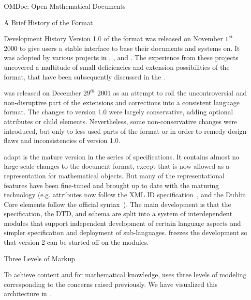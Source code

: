 \begin{tchapter}[id=omdoc-markup,short=Open Mathematical Documents]{OMDoc: Open Mathematical Documents}
\begin{tsection}[id=omdoc-history]{A Brief History of the {\omdoc} Format}
  \begin{tsubsection}{Development History} 
    Version 1.0 of the {\omdoc} format was released on November $1^{st}$ 2000 to give
    users a stable interface to base their documents and systems on. It was adopted by
    various projects in {},
    {}, and
    {}. The experience from these projects
    uncovered a multitude of small deficiencies and extension possibilities of the format,
    that have been subsequently discussed in the {\omdoc} {}.

    {} was released on December $29^{th}$ 2001 as an attempt to roll the
    uncontroversial and non-disruptive part of the extensions and corrections into a
    consistent language format. The changes to version 1.0 were largely conservative,
    adding optional attributes or child elements. Nevertheless, some non-conservative
    changes were introduced, but only to less used parts of the format or in order to
    remedy design flaws and inconsistencies of version 1.0.

\begin{oldpart}{adapt}
    {} is the mature version in the {} series of specifications. It
    contains almost no large-scale changes to the document format, except that {\cmathml}
    is now allowed as a representation for mathematical objects. But many of the
    representational features have been fine-tuned and brought up to date with the
    maturing {\xml} technology (e.g. {} attributes now follow
    the XML ID specification~\cite{XML:id05}, and the Dublin Core elements follow the
    official syntax~\cite{DCMI:dmt03}). The main development is that the {\omdoc}
    specification, the DTD, and schema are split into a system of interdependent modules
    that support independent development of certain language aspects and simpler
    specification and deployment of sub-languages.  {} freezes the development
    so that version 2 can be started off on the modules.
  \end{oldpart}
\end{tsubsection}
\end{tsection}

\begin{tsection}[id=three-level-markup]{Three Levels of Markup}

  To achieve content and {} for
  mathematical knowledge, {\omdoc} uses three levels of modeling corresponding to the
  concerns raised previously. We have visualized this architecture in
  {}.


\end{tsection}
\end{tchapter}
